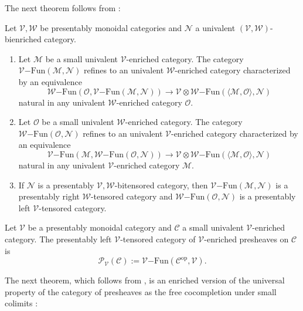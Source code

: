 \documentclass[10pt,oneside]{article}
\numberwithin{equation}{section} %
\numberwithin{figure}{section} %
\theoremstyle{plain}
\theoremstyle{definition}
\newcommand{\mC}{{\mathcal C}}
\newcommand{\mM}{{\mathcal M}}
\newcommand{\mN}{{\mathcal N}}
\newcommand{\mO}{{\mathcal O}}
\newcommand{\mP}{{\mathcal P}}
\newcommand{\mV}{{\mathcal V}}
\newcommand{\mW}{{\mathcal W}}
\newcommand{\op}{\mathrm{op}}
\newcommand{\ot}{\otimes}
\newcommand{\Fun}{\mathrm{Fun}}
\begin{document}
The next theorem follows from \cite[Proposition 4.11 and Theorem 4.86]{heine2024bienriched}:

\begin{theorem}\label{psinho} Let $\mV, \mW$ be presentably monoidal categories and $\mN$ a univalent $(\mV, \mW)$-bienriched category. 
\begin{enumerate}[\normalfont(1)]\setlength{\itemsep}{-2pt}
\item Let $\mM$ be a small univalent $\mV$-enriched category. The
category ${\mV\mathrm{-}\Fun}(\mM, \mN)$ refines to an univalent $\mW$-enriched category characterized by an 
equivalence
$$ \mW\mathrm{-}\Fun(\mO,{\mV\mathrm{-}\Fun}(\mM, \mN)) \to {\mV \ot \mW\mathrm{-}\Fun}(\langle\mM,\mO\rangle,\mN)$$
natural in any univalent $\mW$-enriched category $\mO$.
\item Let $\mO$ be a small univalent $\mW$-enriched category. 
The category ${\mW\mathrm{-}\Fun}(\mO, \mN)$ refines to an univalent $\mV$-enriched category characterized by an equivalence
$$ \mV\mathrm{-}\Fun(\mM,{\mW\mathrm{-}\Fun}(\mO, \mN)) \to {\mV \ot \mW\mathrm{-}\Fun}(\langle\mM,\mO\rangle,\mN) $$
natural in any univalent $\mV$-enriched category $\mM$.

\item If $\mN$ is a presentably $\mV, \mW$-bitensored category, then ${\mV\mathrm{-}\Fun}(\mM, {\mN}) $ is a presentably right $\mW$-tensored category and ${\mW\mathrm{-}\Fun}(\mO, {\mN}) $ is a presentably left $\mV$-tensored category.

\end{enumerate}

\end{theorem}
    
\begin{definition}

Let $\mV$ be a presentably monoidal category and $\mC$ a small univalent $\mV$-enriched category.
The presentably left $\mV$-tensored category of $\mV$-enriched presheaves on $\mC$ is
$$ \mP_\mV(\mC):= \mV\mathrm{-}\Fun(\mC^\op,\mV). $$
\end{definition}

The next theorem, which follows from \cite[Theorem 3.41 and Theorem 4.70]{heine2024bienriched}, is an enriched version of the universal property of the category of presheaves as the free cocompletion under small colimits \cite[Theorem 5.1.5.6]{lurie.HTT}:
\end{document}
